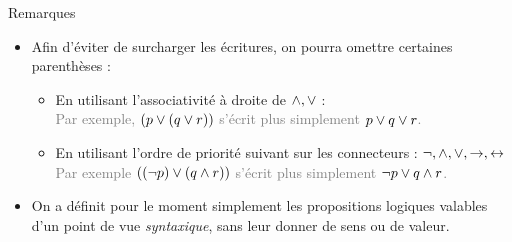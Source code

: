 \documentclass[10pt]{beamer}
\begin{document}
\begin{frame}{\Ctitle}{\stitle}
    \begin{block}{Remarques}
        \begin{itemize}
            \item Afin d'éviter de surcharger les écritures, on pourra omettre certaines parenthèses :
            \begin{itemize}
                \item<2-> En utilisant l'associativité à droite de $\wedge, \vee$ : \\
                 \textcolor{gray}{Par exemple, $(p \vee (q \vee r))$ s'écrit plus simplement $p \vee q \vee r$.}
                \item<4-> En utilisant l'ordre de priorité suivant sur les connecteurs : $\neg, \wedge, \vee, \to, \leftrightarrow$ \\
                 \textcolor{gray}{Par exemple $ ((\neg p) \vee (q \wedge r))$ s'écrit plus simplement $\neg p \vee q \wedge r$.}
            \end{itemize}
            \item<7-> On a définit pour le moment simplement les propositions logiques valables d'un point de vue \textit{syntaxique}, sans leur donner de sens ou de valeur.
        \end{itemize}
    \end{block}
\end{frame}
\end{document}
